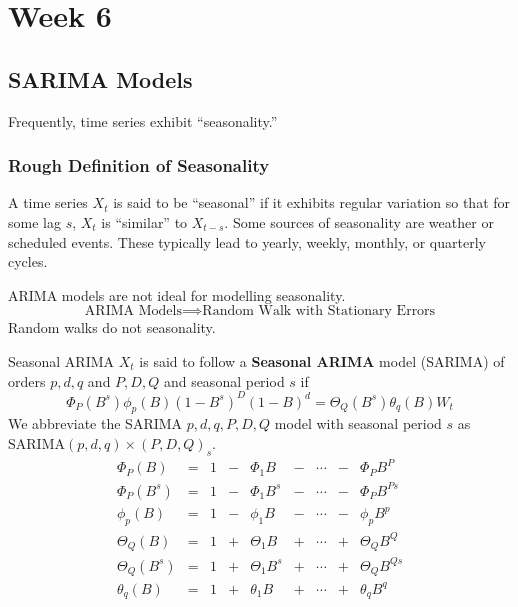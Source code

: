 \chapter{Week 6}
\section{SARIMA Models}
Frequently, time series exhibit ``seasonality.''
\subsection*{Rough Definition of Seasonality}
A time series $ X_t $ is said to be ``seasonal''
if it exhibits regular variation so that for some lag $ s $,
$ X_t $ is ``similar'' to $ X_{t-s} $.
Some sources of seasonality are weather or scheduled events.
These typically lead to yearly, weekly, monthly, or quarterly cycles.
\begin{Remark}{}{}
      ARIMA models are not ideal for modelling seasonality.
      \[ \text{ARIMA Models}\implies\text{Random Walk with Stationary Errors} \]
      Random walks do not seasonality.
\end{Remark}
\begin{Definition}{Seasonal ARIMA}{}
      $ X_t $ is said to follow a \textbf{Seasonal ARIMA} model (SARIMA)
      of orders $ p,d,q $ and $ P,D,Q $ and seasonal period $ s $
      if
      \[ \Phi_P(B^s)\phi_p(B)(1-B^s)^D(1-B)^d=\Theta_Q(B^s)\theta_q(B)W_t \]
      We abbreviate the SARIMA $ p,d,q,P,D,Q $ model with seasonal
      period $ s $ as $ \text{SARIMA}(p,d,q)\times(P,D,Q)_s $.
      \[ \begin{array}{ccccccccc}
                  \Phi_P(B)     & = & 1 & - & \Phi_1 B     & - & \cdots & - & \Phi_P B^P      \\
                  \Phi_P(B^s)   & = & 1 & - & \Phi_1 B^s   & - & \cdots & - & \Phi_P B^{Ps}   \\
                  \phi_p(B)     & = & 1 & - & \phi_1 B     & - & \cdots & - & \phi_p B^p      \\
                  \Theta_Q(B)   & = & 1 & + & \Theta_1 B   & + & \cdots & + & \Theta_Q B^Q    \\
                  \Theta_Q(B^s) & = & 1 & + & \Theta_1 B^s & + & \cdots & + & \Theta_Q B^{Qs} \\
                  \theta_q(B)   & = & 1 & + & \theta_1 B   & + & \cdots & + & \theta_q B^q    \\
            \end{array} \]
\end{Definition}
